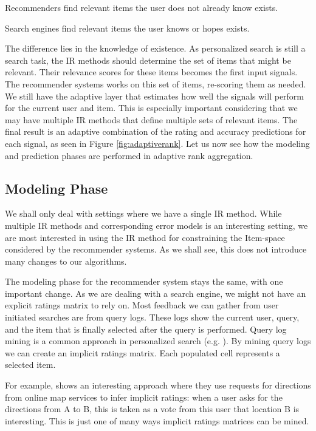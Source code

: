 \begin{itemize*}
  \item Recommenders find relevant items the user does not already know exists.
  \item Search engines find relevant items the user knows or hopes exists.
\end{itemize*}

The difference lies in the knowledge of existence.
As personalized search is still a search task, the IR methods should determine the set of items that might be relevant.
Their relevance scores for these items becomes the first input signals.
The recommender systems works on this set of items, re-scoring them as needed.
We still have the adaptive layer that estimates how well the signals will perform for the current user and item.
This is especially important considering that we may have multiple IR methods that define multiple sets of relevant items.
The final result is an adaptive combination of the rating and accuracy predictions for each signal,
as seen in Figure \ref{fig:adaptiverank}.
Let us now see how the modeling and prediction phases are performed in adaptive rank aggregation.



\subsection{Modeling Phase}

We shall only deal with settings where we have a single IR method.
While multiple IR methods and corresponding error models is an interesting
setting, we are most interested in using the IR method for constraining the Item-space considered by the recommender systems.
As we shall see, this does not introduce many changes to our algorithms.

The modeling phase for the recommender system stays the same, with one important change.
As we are dealing with a search engine, we might not have an explicit ratings matrix to rely on.
Most feedback we can gather from user initiated searches are from query logs.
These logs show the current user, query, and the item that is finally selected after the query is performed.
Query log mining is a common approach in personalized search
(e.g. \cite{Liu2002, Sugiyama2004, Shen2005, Speretta2000}).
By mining query logs we can create an implicit ratings matrix.
Each populated cell represents a selected item.

For example, \cite{Venetis2011} shows an interesting approach where they use requests for directions
from online map services to infer implicit ratings:
when a user asks for the directions from A to B, this is taken 
as a vote from this user that location B is interesting.
This is just one of many ways implicit ratings matrices can be mined.

